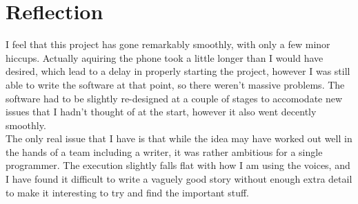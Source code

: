 \documentclass[12pt]{article}
\begin{document}
\FloatBarrier
\section{Reflection} %
I feel that this project has gone remarkably smoothly, with only a few minor hiccups. 
Actually aquiring the phone took a little longer than I would have desired, 
which lead to a delay in properly starting the project, 
however I was still able to write the software at that point, so there weren't massive problems. 
The software had to be slightly re-designed at a couple of stages to accomodate new issues that I hadn't thought of at the start, 
however it also went decently smoothly.\\
The only real issue that I have is that while the idea may have worked out well in the hands of a team including a writer,
it was rather ambitious for a single programmer. 
The execution slightly falls flat with how I am using the voices, 
and I have found it difficult to write a vaguely good story without enough extra detail to make it interesting to try and find the important stuff.
\end{document}
